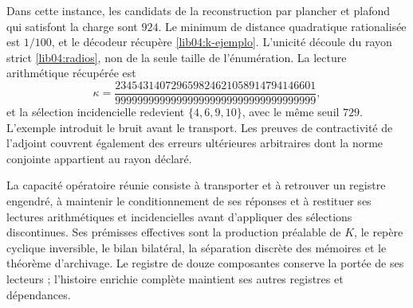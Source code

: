 Dans cette instance, les candidats de la reconstruction par plancher et
plafond qui satisfont la charge sont \(924\). Le minimum de distance
quadratique rationalisée est \(1/100\), et le décodeur récupère
\eqref{lib04:k-ejemplo}. L’unicité découle du rayon strict
\eqref{lib04:radios}, non de la seule taille de l’énumération.
La lecture arithmétique récupérée est
\begin{equation}
 \kappa=
 \frac{234543140729659824621058914794146601}
      {999999999999999999999999999999999999},
 \label{lib04:kappa-ejemplo}
\end{equation}
et la sélection incidencielle redevient \(\{4,6,9,10\}\), avec
le même seuil \(729\). L’exemple introduit le bruit avant le
transport. Les preuves de contractivité de l’adjoint couvrent également
des erreurs ultérieures arbitraires dont la norme conjointe appartient au
rayon déclaré.

La capacité opératoire réunie consiste à transporter et à retrouver un registre
engendré, à maintenir le conditionnement de ses réponses et à restituer
ses lectures arithmétiques et incidencielles avant d’appliquer des sélections
discontinues. Ses prémisses effectives sont la production préalable de
\(K\), le repère cyclique inversible, le bilan bilatéral, la
séparation discrète des mémoires et le théorème d’archivage. Le
registre de douze composantes conserve la portée de ses lecteurs ;
l’histoire enrichie complète maintient ses autres registres et
dépendances.
